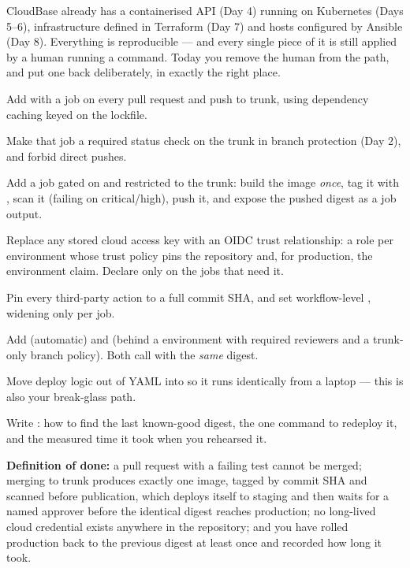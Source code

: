 CloudBase already has a containerised API (Day 4) running on Kubernetes (Days 5--6), infrastructure defined in Terraform (Day 7) and hosts configured by Ansible (Day 8). Everything is reproducible --- and every single piece of it is still applied by a human running a command. Today you remove the human from the path, and put one back deliberately, in exactly the right place.

\begin{buildalong}
\begin{wbitem}
  \item Add  with a  job on every pull request and push to trunk, using dependency caching keyed on the lockfile.
  \item Make that job a required status check on the trunk in branch protection (Day 2), and forbid direct pushes.
  \item Add a  job gated on  and restricted to the trunk: build the image \emph{once}, tag it with , scan it (failing on critical/high), push it, and expose the pushed digest as a job output.
  \item Replace any stored cloud access key with an OIDC trust relationship: a role per environment whose trust policy pins the repository and, for production, the environment claim. Declare  only on the jobs that need it.
  \item Pin every third-party action to a full commit SHA, and set workflow-level , widening only per job.
  \item Add  (automatic) and  (behind a  environment with required reviewers and a trunk-only branch policy). Both call  with the \emph{same} digest.
  \item Move deploy logic out of YAML into  so it runs identically from a laptop --- this is also your break-glass path.
  \item Write : how to find the last known-good digest, the one command to redeploy it, and the measured time it took when you rehearsed it.
\end{wbitem}
\smallskip\textbf{Definition of done:} a pull request with a failing test cannot be merged; merging to trunk produces exactly one image, tagged by commit SHA and scanned before publication, which deploys itself to staging and then waits for a named approver before the identical digest reaches production; no long-lived cloud credential exists anywhere in the repository; and you have rolled production back to the previous digest at least once and recorded how long it took.
\end{buildalong}


